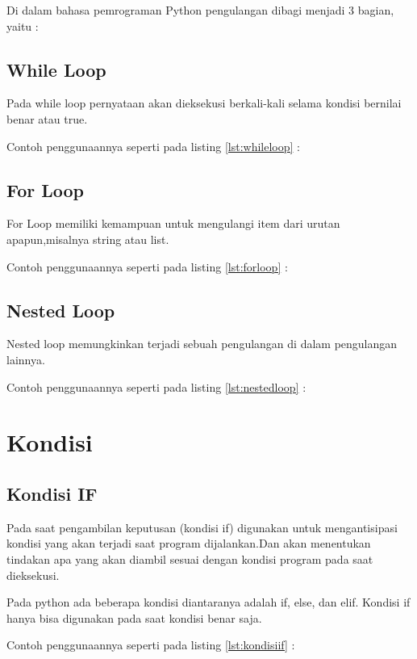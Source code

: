 Di dalam bahasa pemrograman Python pengulangan dibagi menjadi 3 bagian, yaitu :
\subsection{While Loop}
Pada while loop pernyataan akan dieksekusi berkali-kali selama kondisi bernilai benar atau true.

Contoh penggunaannya seperti pada listing \ref{lst:whileloop} :


\subsection{For Loop}
For Loop memiliki kemampuan untuk mengulangi item dari urutan apapun,misalnya string atau list.

Contoh penggunaannya seperti pada listing \ref{lst:forloop} :

 
\subsection{Nested Loop} 
Nested loop memungkinkan terjadi sebuah pengulangan di dalam pengulangan lainnya.

Contoh penggunaannya seperti pada listing \ref{lst:nestedloop} :


\section{Kondisi}
\subsection{Kondisi IF}
Pada saat pengambilan keputusan (kondisi if) digunakan untuk mengantisipasi kondisi yang akan terjadi saat program dijalankan.Dan akan menentukan tindakan apa yang akan diambil sesuai dengan kondisi program pada saat dieksekusi.

Pada python ada beberapa kondisi diantaranya adalah if, else, dan elif. Kondisi if hanya bisa digunakan pada saat kondisi benar saja.

Contoh penggunaannya seperti pada listing \ref{lst:kondisiif} :


